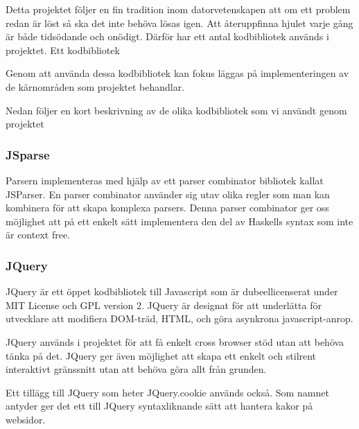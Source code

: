 Detta projektet följer en fin tradition inom datorvetenskapen att om ett problem redan är löst så ska det inte behöva lösas igen. Att återuppfinna hjulet varje gång är både tidsödande och onödigt. 
Därför har ett antal kodbibliotek används i projektet. Ett kodbibliotek


Genom att använda dessa kodbibliotek kan fokus läggas på implementeringen av de kärnområden som projektet behandlar.

Nedan följer en kort beskrivning av de olika kodbibliotek som vi användt genom projektet

 \subsubsection{JSparse}  
Parsern implementeras med hjälp av ett parser combinator bibliotek kallat JSParser.
En parser combinator använder sig utav olika regler som man kan kombinera för att skapa komplexa parsers. 
Denna parser combinator ger oss möjlighet att på ett enkelt sätt
implementera den del av  Haskells syntax som inte är context free.

\subsubsection{JQuery} 

JQuery är ett öppet kodbibliotek till Javascript som är dubeellicenserat under MIT License och GPL version 2.  
JQuery är designat för att underlätta för utvecklare att modifiera DOM-träd, HTML, och göra asynkrona javascript-anrop.

JQuery används i projektet för att få enkelt cross browser stöd utan att behöva tänka på det. 
JQuery ger även möjlighet att skapa ett enkelt och stilrent interaktivt gränssnitt utan att behöva göra allt från grunden.

Ett tillägg till JQuery som heter JQuery.cookie används också. Som namnet antyder ger det ett till JQuery syntaxliknande sätt att hantera kakor på websidor.  







